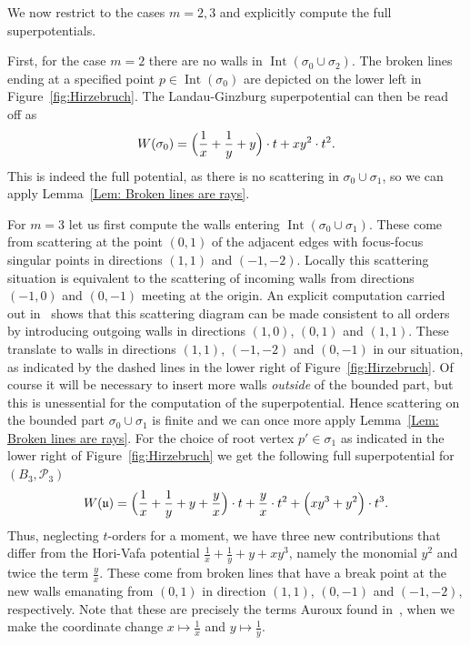 \documentclass[11pt,letter]{amsart}
\theoremstyle{definition}
\theoremstyle{remark}
\numberwithin{equation}{section}
\numberwithin{figure}{section}
\newcommand {\fou}  {\mathfrak{u}}
\newcommand {\Int}  {\operatorname{Int}}
\renewcommand{\P}  {\mathscr{P}}
\begin{document}
We now restrict to the cases $m=2,3$ and explicitly compute the full
superpotentials. 

First, for the case $m=2$ there are no walls in $\Int(\sigma_0\cup\sigma_2)$. The broken lines ending at a specified point $p\in\Int(\sigma_0)$ are depicted on the lower left in Figure~\ref{fig:Hirzebruch}. The Landau-Ginzburg superpotential can then be read off as
 \[
W(\sigma_0) = \Bigl(\frac{1}{x} + \frac{1}{y} + y\Bigr) \cdot t +
xy^2 \cdot t^2.
\]
This is indeed the full potential, as there is no scattering in $\sigma_0\cup
\sigma_1$, so we can apply Lemma~\ref{Lem: Broken lines are rays}.

For $m=3$ let us first compute the walls entering $\Int(\sigma_0\cup\sigma_1)$.
These come from scattering at the point $(0,1)$ of the adjacent edges with
focus-focus singular points in directions $(1,1)$ and $(-1,-2)$. Locally this
scattering situation is equivalent to the scattering of incoming walls from
directions $(-1,0)$ and $(0,-1)$ meeting at the origin. An explicit computation
carried out in~\cite[\S4.1]{Invitation} shows that this scattering diagram can
be made consistent to all orders by introducing outgoing walls in directions
$(1,0)$, $(0,1)$ and $(1,1)$. These translate to walls in directions $(1,1)$,
$(-1,-2)$ and $(0,-1)$ in our situation, as indicated by the dashed lines in the
lower right of Figure~\ref{fig:Hirzebruch}. Of course it will be necessary to
insert more walls \emph{outside} of the bounded part, but this is unessential
for the computation of the superpotential. Hence scattering on the bounded part
$\sigma_0 \cup \sigma_1$ is finite and we can once more apply Lemma~\ref{Lem:
Broken lines are rays}. For the choice of root vertex $p'\in\sigma_1$ as
indicated in the lower right of Figure~\ref{fig:Hirzebruch} we get the
following full superpotential for $(B_3, \P_3)$
 \[
W(\fou) = \Bigl(\frac{1}{x} + \frac{1}{y} + y + \frac{y}{x}\Bigr) \cdot t  + \frac{y}{x} \cdot t^2 +
\Bigl(xy^3  + y^2\Bigr)\cdot t^3.
\]
Thus, neglecting $t$-orders for a moment, we have three new contributions that
differ from the Hori-Vafa potential $\frac{1}{x} + \frac{1}{y} + y + xy^3$,
namely the monomial $y^2$ and twice the term $\frac{y}{x}$. These come from
broken lines that have a break point at the new walls emanating from $(0,1)$ in
direction $(1,1)$, $(0,-1)$ and $(-1,-2)$, respectively. Note that these are
precisely the terms Auroux found in~\cite[Prop.\,3.2]{auroux2}, when we make the
coordinate change $x \mapsto \frac{1}{x}$ and $y \mapsto \frac{1}{y}$.
\end{document}
